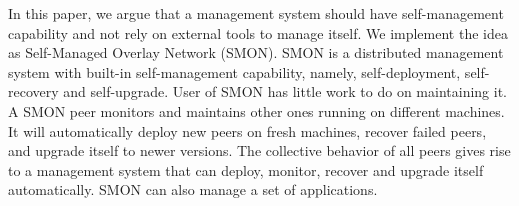 
In this paper, we argue that a management system should have
self-management capability and not rely on external tools to
manage itself. We implement the idea as Self-Managed Overlay
Network (SMON). SMON is a distributed management system with
built-in self-management capability, namely,
self-deployment, self-recovery and self-upgrade. User of
SMON has little work to do on maintaining it. A SMON peer
monitors and maintains other ones running on different
machines. It will automatically deploy new peers on fresh
machines, recover failed peers, and upgrade itself to newer
versions. The collective behavior of all peers gives rise to
a management system that can deploy, monitor, recover and
upgrade itself automatically. SMON can also manage a set of
applications.


